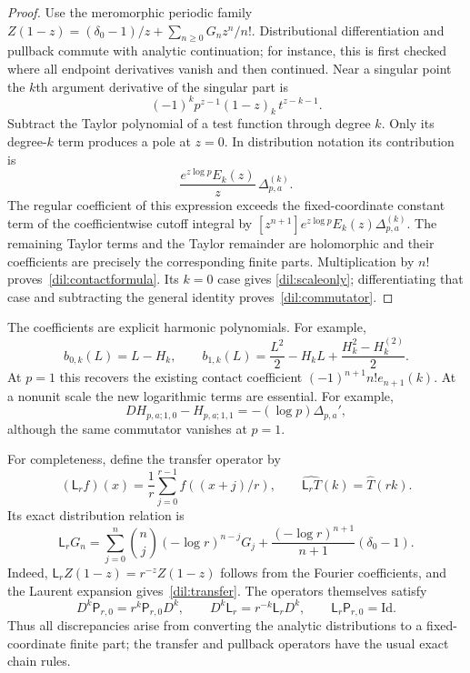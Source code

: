 \begin{proof}
Use the meromorphic periodic family
$Z(1-z)=(\delta_0-1)/z+
\sum_{n\geq0}G_nz^n/n!$. Distributional differentiation and pullback
commute with analytic continuation; for instance, this is first checked
where all endpoint derivatives vanish and then continued. Near a singular
point the $k$th argument derivative of the singular part is
\[
 (-1)^k p^{z-1}(1-z)_k\,t^{z-k-1}.
\]
Subtract the Taylor polynomial of a test function through degree $k$.
Only its degree-$k$ term produces a pole at $z=0$. In distribution
notation its contribution is
\[
 \frac{e^{z\log p}E_k(z)}{z}\,\Delta_{p,a}^{(k)}.
\]
The regular coefficient of this expression exceeds the fixed-coordinate
constant term of the coefficientwise cutoff integral by
$[z^{n+1}]e^{z\log p}E_k(z)\Delta_{p,a}^{(k)}$. The remaining Taylor
terms and the Taylor remainder are holomorphic and their coefficients
are precisely the corresponding finite parts. Multiplication by $n!$
proves~\eqref{dil:contactformula}. Its $k=0$ case gives
\eqref{dil:scaleonly}; differentiating that case and subtracting the
general identity proves~\eqref{dil:commutator}.
\end{proof}

The coefficients are explicit harmonic polynomials. For example,
\[
 b_{0,k}(L)=L-H_k,\qquad
 b_{1,k}(L)=\frac{L^2}{2}-H_kL+
                \frac{H_k^2-H_k^{(2)}}2.
\]
At $p=1$ this recovers the existing contact coefficient
$(-1)^{n+1}n!e_{n+1}(k)$. At a nonunit scale the new logarithmic terms
are essential. For example,
\[
 DH_{p,a;1,0}-H_{p,a;1,1}=-(\log p)\Delta_{p,a}',
\]
although the same commutator vanishes at $p=1$.

For completeness, define the transfer operator by
\[
 (\mathsf L_r f)(x)=\frac1r\sum_{j=0}^{r-1}f((x+j)/r),
 \qquad \widehat{\mathsf L_rT}(k)=\widehat T(rk).
\]
Its exact distribution relation is
\begin{equation}\label{dil:transfer}
 \mathsf L_rG_n=\sum_{j=0}^n\binom nj(-\log r)^{n-j}G_j
       +\frac{(-\log r)^{n+1}}{n+1}(\delta_0-1).
\end{equation}
Indeed, $\mathsf L_rZ(1-z)=r^{-z}Z(1-z)$ follows from the Fourier
coefficients, and the Laurent expansion gives~\eqref{dil:transfer}.
The operators themselves satisfy
\[
 D^k\mathsf P_{r,0}=r^k\mathsf P_{r,0}D^k,\qquad
 D^k\mathsf L_r=r^{-k}\mathsf L_rD^k,\qquad
 \mathsf L_r\mathsf P_{r,0}=\mathrm{Id}.
\]
Thus all discrepancies arise from converting the analytic distributions
to a fixed-coordinate finite part; the transfer and pullback operators
have the usual exact chain rules.

